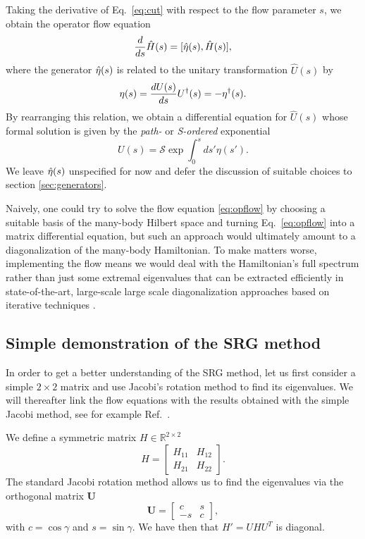 Taking the derivative of Eq.~\eqref{eq:cut}
with respect to the flow parameter $s$, we obtain the operator flow equation
\begin{equation}\label{eq:opflow}
  \totd{}{s}\hat{H}(s) = \comm{\etaO(s)}{\hat{H}(s)},
\end{equation} 
where the generator $\hat{\eta}(s)$ is related to the unitary transformation $\hat{U}(s)$ by
\begin{equation}
  \eta(s)= \frac{d {U(s)}} {d {s}} U^{\dag}(s) = -\eta^{\dag}(s).
\end{equation}
By rearranging this relation, we obtain a differential equation for $\hat{U}(s)$ whose formal solution is given by the \emph{path-}
or \emph{S-ordered} exponential
\begin{equation}
  U(s) = \mathcal{S}\exp \int^s_0 ds' \eta(s').
\end{equation}
We leave $\hat{\eta}(s)$ unspecified for now and defer the discussion of suitable choices to section \ref{sec:generators}. 

Naively, one could try to solve the flow equation \eqref{eq:opflow} by
choosing a suitable basis of the many-body Hilbert space and turning
Eq.~\eqref{eq:opflow} into a matrix differential equation, but such an
approach would ultimately amount to a diagonalization of the many-body
Hamiltonian. To make matters worse, implementing the flow means we
would deal with the Hamiltonian's full spectrum rather than just some
extremal eigenvalues that can be extracted efficiently in
state-of-the-art, large-scale large scale diagonalization approaches based on iterative techniques
\cite{golubvaloan1996,navratil2000,barrett2013}.

\subsection{Simple demonstration of the SRG method}
In order to get a better understanding of the SRG method, let us first consider  
a simple $2\times 2$ matrix and use Jacobi's rotation method to find its eigenvalues. 
We will thereafter link the flow equations
with the results obtained with the simple Jacobi method, see for example Ref.~\cite{golubvanloan1996}.

We define a  symmetric matrix  $H\in {\mathbb{R}}^{2\times 2}$
\[ 
H = \begin{bmatrix} H_{11} & H_{12} \\ H_{21} & H_{22}\end{bmatrix}. 
\]
The standard Jacobi rotation method allows us to find the eigenvalues via the orthogonal matrix
$\mathbf{U}$ 
\[ 
\mathbf{U} = \begin{bmatrix} c & s \\ -s & c
\end{bmatrix}, 
\]
with $c = \cos \gamma$ and $s = \sin \gamma$. We have then that  $H' = UHU^T$ is diagonal. 

